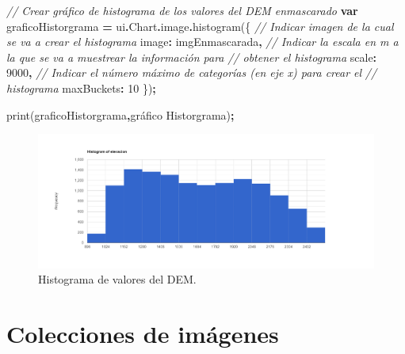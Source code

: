 \documentclass[
  12pt,
  letterpaper,
  twoside]{book}
\newenvironment{Shaded}{\begin{snugshade}}{\end{snugshade}}
\newcommand{\AttributeTok}[1]{\textcolor[rgb]{0.77,0.63,0.00}{#1}}
\newcommand{\CommentTok}[1]{\textcolor[rgb]{0.56,0.35,0.01}{\textit{#1}}}
\newcommand{\DataTypeTok}[1]{\textcolor[rgb]{0.13,0.29,0.53}{#1}}
\newcommand{\DecValTok}[1]{\textcolor[rgb]{0.00,0.00,0.81}{#1}}
\newcommand{\FunctionTok}[1]{\textcolor[rgb]{0.00,0.00,0.00}{#1}}
\newcommand{\KeywordTok}[1]{\textcolor[rgb]{0.13,0.29,0.53}{\textbf{#1}}}
\newcommand{\NormalTok}[1]{#1}
\newcommand{\OperatorTok}[1]{\textcolor[rgb]{0.81,0.36,0.00}{\textbf{#1}}}
\newcommand{\StringTok}[1]{\textcolor[rgb]{0.31,0.60,0.02}{#1}}
\begin{document}
\begin{Shaded}
\begin{Highlighting}[]
\CommentTok{// Crear gráfico de histograma de los valores del DEM enmascarado}
\KeywordTok{var}\NormalTok{ graficoHistorgrama }\OperatorTok{=}\NormalTok{ ui}\OperatorTok{.}\AttributeTok{Chart}\OperatorTok{.}\AttributeTok{image}\OperatorTok{.}\FunctionTok{histogram}\NormalTok{(\{}
     \CommentTok{// Indicar imagen de la cual se va a crear el histograma  }
  \DataTypeTok{image}\OperatorTok{:}\NormalTok{ imgEnmascarada}\OperatorTok{,}
  \CommentTok{// Indicar la escala en m a la que se va a muestrear la información para  }
  \CommentTok{// obtener el histograma}
  \DataTypeTok{scale}\OperatorTok{:} \DecValTok{9000}\OperatorTok{,}
  \CommentTok{// Indicar el número máximo de categorías (en eje x) para crear el }
  \CommentTok{// histograma}
  \DataTypeTok{maxBuckets}\OperatorTok{:} \DecValTok{10}
\NormalTok{  \})}\OperatorTok{;}

\FunctionTok{print}\NormalTok{(graficoHistorgrama}\OperatorTok{,}\StringTok{\textquotesingle{}gráfico Historgrama\textquotesingle{}}\NormalTok{)}\OperatorTok{;}
\end{Highlighting}
\end{Shaded}

\begin{figure}

{\centering \includegraphics[width=1\linewidth]{Img/histElevacion} 

}

\caption{Histograma de valores del DEM.}\label{fig:unnamed-chunk-123}
\end{figure}

\newpage

\hypertarget{colecciones-de-imuxe1genes}{%
\chapter{Colecciones de imágenes}\label{colecciones-de-imuxe1genes}}
\end{document}
